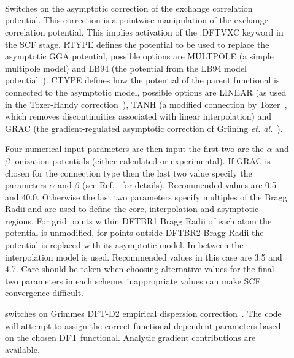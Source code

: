 \begin{description}

\item[]
   \\
   \\
   \\
  Switches on the asymptotic correction of the exchange correlation potential. This correction is a pointwise manipulation of the 
  exchange--correlation potential. This implies activation of the .DFTVXC keyword in the SCF stage. RTYPE defines the
  potential to be used to replace the asymptotic GGA potential, possible options are MULTPOLE (a simple multipole model)
  and LB94 (the potential from the LB94 model potential~\cite{dft:lb94}). CTYPE defines how the potential of the parent
  functional is connected to the asymptotic model, possible options are LINEAR (as used in the Tozer-Handy correction~\cite{dft:th}), 
  TANH (a modified connection by Tozer~\cite{dft:tanh}, which removes discontinuities associated with linear interpolation) and 
  GRAC (the gradient-regulated asymptotic correction of Gr\"uning \emph{et. al.}~\cite{dft:grac}). 
  
  Four numerical input parameters are then input
  the first two are the $\alpha$ and $\beta$ ionization potentials (either calculated or experimental). If GRAC is chosen for the 
  connection type then the last two value specify the parameters $\alpha$ and $\beta$ (see Ref.~\cite{dft:grac} for details). 
  Recommended values are 0.5 and 40.0. Otherwise the last two parameters specify multiples of the 
  Bragg Radii and are used to define the core, interpolation and asymptotic regions. For grid points within DFTBR1 Bragg Radii of 
  each atom the potential is unmodified, for points outside DFTBR2 Bragg Radii the potential is replaced with its asymptotic model.
  In between the interpolation model is used. Recommended values in this case are 3.5 and 4.7. Care should be taken when 
  choosing alternative values for the final two parameters in each scheme, inappropriate values can make SCF convergence difficult.


\item[]
  switches on Grimmes DFT-D2 empirical dispersion correction~\cite{dft:dftd2}. The code will attempt to assign the correct functional dependent 
  parameters based on the chosen DFT functional. Analytic gradient contributions are available.
 

\end{description}
